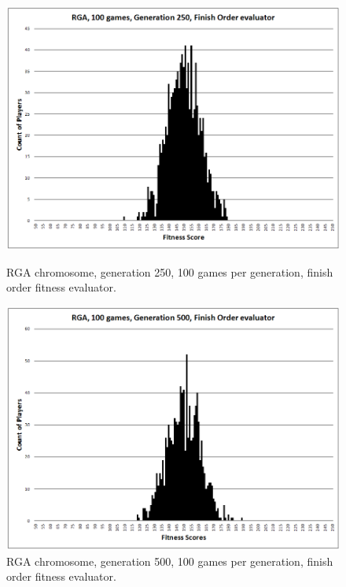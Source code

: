 \begin{figure}
\centering
\begin{minipage}[t]{0.47\linewidth}
\centering
\includegraphics[width=1.0\linewidth]{Figures/RGA_1024_G250_N100_FO.png}
\caption[RGA Fitness Distribution, 250th Generation]{RGA chromosome, generation
250, 100 games per generation, finish order fitness evaluator.} 
\label{figure-RGA-250th_gen_fitness}
\end{minipage}%
\hspace{0.06\linewidth}%
\begin{minipage}[t]{0.47\linewidth}
\centering
\includegraphics[width=1.0\linewidth]{Figures/RGA_1024_G500_N100_FO.png}
\caption[RGA Fitness Distribution, 500th Generation]{RGA chromosome, generation
500, 100 games per generation, finish order fitness evaluator.} 
\label{figure-RGA-500th_gen_fitness}
\end{minipage}


\end{figure}
